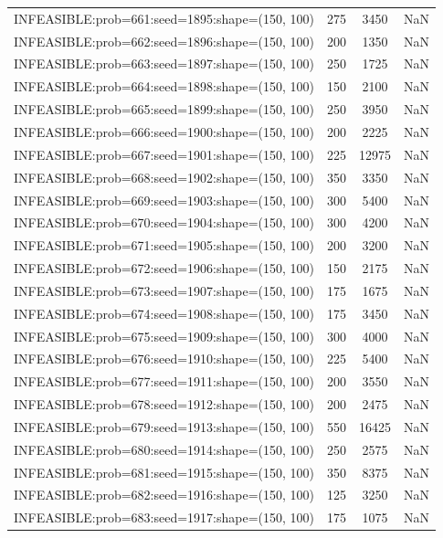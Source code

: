 \begin{longtable}{lccc}
INFEASIBLE:prob=661:seed=1895:shape=(150, 100) &      275 &  3450 &    NaN \\
INFEASIBLE:prob=662:seed=1896:shape=(150, 100) &      200 &  1350 &    NaN \\
INFEASIBLE:prob=663:seed=1897:shape=(150, 100) &      250 &  1725 &    NaN \\
INFEASIBLE:prob=664:seed=1898:shape=(150, 100) &      150 &  2100 &    NaN \\
INFEASIBLE:prob=665:seed=1899:shape=(150, 100) &      250 &  3950 &    NaN \\
INFEASIBLE:prob=666:seed=1900:shape=(150, 100) &      200 &  2225 &    NaN \\
INFEASIBLE:prob=667:seed=1901:shape=(150, 100) &      225 & 12975 &    NaN \\
INFEASIBLE:prob=668:seed=1902:shape=(150, 100) &      350 &  3350 &    NaN \\
INFEASIBLE:prob=669:seed=1903:shape=(150, 100) &      300 &  5400 &    NaN \\
INFEASIBLE:prob=670:seed=1904:shape=(150, 100) &      300 &  4200 &    NaN \\
INFEASIBLE:prob=671:seed=1905:shape=(150, 100) &      200 &  3200 &    NaN \\
INFEASIBLE:prob=672:seed=1906:shape=(150, 100) &      150 &  2175 &    NaN \\
INFEASIBLE:prob=673:seed=1907:shape=(150, 100) &      175 &  1675 &    NaN \\
INFEASIBLE:prob=674:seed=1908:shape=(150, 100) &      175 &  3450 &    NaN \\
INFEASIBLE:prob=675:seed=1909:shape=(150, 100) &      300 &  4000 &    NaN \\
INFEASIBLE:prob=676:seed=1910:shape=(150, 100) &      225 &  5400 &    NaN \\
INFEASIBLE:prob=677:seed=1911:shape=(150, 100) &      200 &  3550 &    NaN \\
INFEASIBLE:prob=678:seed=1912:shape=(150, 100) &      200 &  2475 &    NaN \\
INFEASIBLE:prob=679:seed=1913:shape=(150, 100) &      550 & 16425 &    NaN \\
INFEASIBLE:prob=680:seed=1914:shape=(150, 100) &      250 &  2575 &    NaN \\
INFEASIBLE:prob=681:seed=1915:shape=(150, 100) &      350 &  8375 &    NaN \\
INFEASIBLE:prob=682:seed=1916:shape=(150, 100) &      125 &  3250 &    NaN \\
INFEASIBLE:prob=683:seed=1917:shape=(150, 100) &      175 &  1075 &    NaN \\

\end{longtable}
